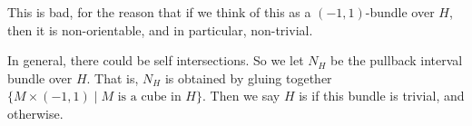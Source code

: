\documentclass[a4paper]{article}
\begin{document}
\pgfplotsset{width=7cm,compat=1.8}
\begin{center}
\end{center}

This is bad, for the reason that if we think of this as a $(-1, 1)$-bundle over $H$, then it is non-orientable, and in particular, non-trivial.

In general, there could be self intersections. So we let $N_H$ be the pullback interval bundle over $H$. That is, $N_H$ is obtained by gluing together $\{M \times (-1, 1) \mid M\text{ is a cube in }H\}$. Then we say $H$ is  if this bundle is trivial, and  otherwise.
\end{document}

